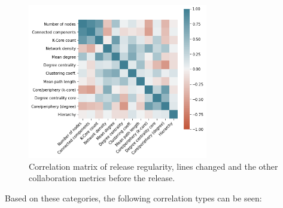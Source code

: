 \begin{figure}[!htbp]
    \centering
    \includegraphics[width=0.7\textwidth]{figures/quantitative/corr_matrix/corr_before.png}
    \caption{Correlation matrix of release regularity, lines changed and the other collaboration metrics before the release.}
    \label{fig:corr_matrix}
\end{figure}

Based on these categories, the following correlation types can be seen:

